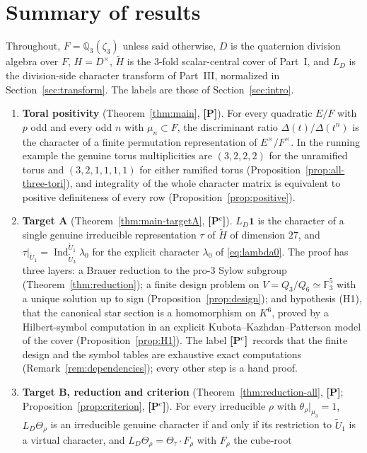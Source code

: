 \documentclass[11pt]{article}
\newcommand{\Q}{\mathbb Q}
\newcommand{\Fq}{\mathbb F}
\newcommand{\Ind}{\operatorname{Ind}}
\newcommand{\tH}{\widetilde H}
\newcommand{\tU}{\widetilde U}
\newcommand{\Ptag}{\textnormal{\textbf{[P]}}}
\newcommand{\Pctag}{\textnormal{\textbf{[P$^{\mathrm c}$]}}}
\theoremstyle{plain}
\theoremstyle{definition}
\begin{document}
\section{Summary of results}\label{sec:summary}
Throughout, $F=\Q_3(\zeta_3)$ unless said otherwise, $D$ is the
quaternion division algebra over $F$, $H=D^\times$, $\tH$ is the
$3$-fold scalar-central cover of Part~I, and $L_D$ is the division-side
character transform of Part~III, normalized in
Section~\ref{sec:transform}.  The labels are those of
Section~\ref{sec:intro}.

\begin{enumerate}[leftmargin=*]
\item \textbf{Toral positivity} (Theorem~\ref{thm:main}, \Ptag).  For
every quadratic $E/F$ with $p$ odd and every odd $n$ with $\mu_n\subset F$,
the discriminant ratio $\Delta(t)/\Delta(t^n)$ is the character of a
finite permutation representation of $E^\times/F^\times$.  In the running
example the genuine torus multiplicities are $(3,2,2,2)$ for the
unramified torus and $(3,2,1,1,1,1)$ for either ramified torus
(Proposition~\ref{prop:all-three-tori}), and integrality of the whole
character matrix is equivalent to positive definiteness of every row
(Proposition~\ref{prop:positive}).
\item \textbf{Target A} (Theorem~\ref{thm:main-targetA}, \Pctag).
$L_D\mathbf1$ is the character of a single genuine irreducible
representation $\tau$ of $\tH$ of dimension $27$, and
$\tau|_{\tU_1}=\Ind_{\tU_3}^{\tU_1}\lambda_0$ for the explicit character
$\lambda_0$ of \eqref{eq:lambda0}.  The proof has three layers: a
Brauer reduction to the pro-$3$ Sylow subgroup
(Theorem~\ref{thm:reduction}); a finite design problem on
$V=Q_3/Q_6\simeq\Fq_3^5$ with a unique solution up to sign
(Proposition~\ref{prop:design}); and hypothesis (H1), that the
canonical star section is a homomorphism on $K^6$, proved by a
Hilbert-symbol computation in an explicit Kubota--Kazhdan--Patterson
model of the cover (Proposition~\ref{prop:H1}).  The label \Pctag\
records that the finite design and the symbol tables are exhaustive
exact computations (Remark~\ref{rem:dependencies}); every other step is
a hand proof.
\item \textbf{Target B, reduction and criterion}
(Theorem~\ref{thm:reduction-all}, \Ptag; Proposition~\ref{prop:criterion}, \Pctag).
For every irreducible $\rho$ with $\theta_\rho|_{\mu_3}=1$,
$L_D\Theta_\rho$ is an irreducible genuine character if and only if its
restriction to $\tU_1$ is a virtual character, and
$L_D\Theta_\rho=\Theta_\tau\cdot F_\rho$ with $F_\rho$ the cube-root

\end{enumerate}
\end{document}

